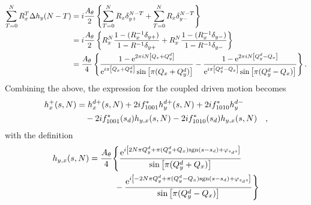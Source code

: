 %
\begin{align}
    \sum\limits_{T=0}^N R_x^T \Delta h_y(N-T)
        &=
        i\frac{A_\theta}{2} \left\{
            \sum\limits_{T=0}^N R_x \delta_{y+}^{N-T}
            +\sum\limits_{T=0}^N R_x \delta_{y-}^{N-T}
        \right\}
        \notag \\
        &=
        i\frac{A_\theta}{2} \left\{
            R_x^N\frac{1-(R_x^{-1}\delta_{y+})}{1-R^{-1}\delta_{y+}}
            +R_x^N\frac{1-(R_x^{-1}\delta_{y-})}{1-R^{-1}\delta_{y-}}
        \right\}
        \notag \\
        &=
        \frac{A_\theta}{4} \left\{
            \frac{1-\text{e}^{2\pi i N\left[ Q_x + Q_y^d \right]}}{\text{e}^{i\pi \left[Q_x+Q_y^d\right]}\sin\left[\pi (Q_x+Q_y^d)\right]}
            -\frac{1-\text{e}^{2\pi i N\left[ Q_y^d - Q_x \right]}}{\text{e}^{i\pi \left[Q_y^d-Q_x\right] }\sin\left[\pi (Q_y^d-Q_x)\right]}
        \right\}
        .
\end{align}
%
Combining the above, the expression for the coupled driven motion becomes
%
\begin{align}
    h_x^+(s,N)&=
    h_x^{d+}(s,N) + 2if^{*}_{1001}  h_y^{d+}(s,N) + 2if^{*}_{1010} h_y^{d-} \notag \\
    &\quad
    -2if^*_{1001}(s_d) h_{y,x}(s,N)
    -2if^*_{1010}(s_d) h_{y,x}(s,N)
    \quad ,
\end{align}
with the definition
%
\begin{align}
    h_{y,x}(s,N) &= 
        \frac{A_\theta}{4} \Bigg\{
             \frac{\text{e}^{i \left[2N \pi Q_y^d + \pi( Q_y^d + Q_x )\text{sgn}(s-s_d) + \varphi_{s_ds}\right]}}
                {\sin\left[\pi (Q_y^d+Q_x)\right]}
                \notag \\  & \quad\quad\quad
            -\frac{\text{e}^{i \left[-2N\pi Q_y^d + \pi( Q_y^d - Q_x )\text{sgn}(s-s_d)+ \varphi_{s_ds}\right]}}
                {\sin\left[\pi (Q_y^d-Q_x)\right]}
        \Bigg\}
\end{align}
%
